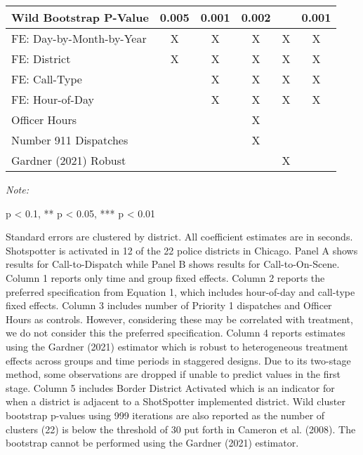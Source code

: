 \begin{table}[H]
\begin{threeparttable}
\begin{tabular}[t]{lccccc}
\hspace{1em}Wild Bootstrap P-Value & 0.005 & 0.001 & 0.002 &  & 0.001\\
\midrule
FE: Day-by-Month-by-Year & X & X & X & X & X\\
FE: District & X & X & X & X & X\\
FE: Call-Type &  & X & X & X & X\\
FE: Hour-of-Day &  & X & X & X & X\\
Officer Hours &  &  & X &  & \\
Number 911 Dispatches &  &  & X &  & \\
Gardner (2021) Robust &  &  &  & X & \\
\bottomrule
\end{tabular}
\begin{tablenotes}
\item \textit{Note: } 
\item * p < 0.1, ** p < 0.05, *** p < 0.01
\item Standard errors are clustered by district. All                      coefficient estimates are in seconds.                  Shotspotter is activated in 12 of the 22 police districts in Chicago.                  Panel A shows results for Call-to-Dispatch while                  Panel B shows results for Call-to-On-Scene. Column 1 reports                  only time and group fixed effects. Column 2 reports the preferred                  specification from Equation 1, which includes hour-of-day and                  call-type fixed effects. Column 3 includes number of Priority 1 dispatches and                  Officer Hours as controls. However, considering these may be correlated with treatment,                  we do not consider this the preferred specification.                  Column 4 reports estimates using                  the Gardner (2021) estimator which is robust to                   heterogeneous treatment effects across groups and time periods                  in staggered designs. Due to its two-stage method, some observations are dropped if                  unable to predict values in the first stage. Column 5 includes Border District Activated                  which is an indicator for when a district is adjacent to a ShotSpotter                  implemented district. Wild cluster bootstrap p-values using 999 iterations are also reported                  as the number of clusters (22) is below the threshold of 30 put forth in                  Cameron et al. (2008). The bootstrap cannot be performed using the Gardner (2021) estimator.                                    
\end{tablenotes}
\end{threeparttable}
\end{table}
